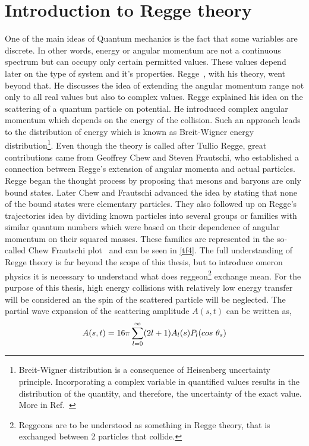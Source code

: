 \section{Introduction to Regge theory}
One of the main ideas of Quantum mechanics is the fact that some variables are discrete. In other words, energy or angular momentum are not a continuous spectrum but can occupy only certain permitted values. These values depend later on the type of system and it's properties. Regge~\cite{Regge}, with his theory, went beyond that. He discusses the idea of extending the angular momentum range not only to all real values but also to complex values. Regge explained his idea on the scattering of a quantum particle on potential. He introduced complex angular momentum which depends on the energy of the collision. Such an approach leads to the distribution of energy which is known as Breit-Wigner energy distribution\footnote{Breit-Wigner distribution is a consequence of Heisenberg uncertainty principle. Incorporating a complex variable in quantified values results in the distribution of the quantity, and therefore, the uncertainty of the exact value. More in Ref.~\cite{Breit1936}}. Even though the theory is called after Tullio Regge, great contributions came from Geoffrey Chew and Steven Frautschi, who established a connection between Regge's extension of angular momenta and actual particles. Regge began the thought process by proposing that mesons and baryons are only bound states. Later Chew and Frautschi advanced the idea by stating that none of the bound states were elementary particles. They also followed up on Regge's trajectories idea by dividing known particles into several groups or families with similar quantum numbers which were based on their dependence of angular momentum on their squared masses. These families are represented in the so-called Chew Frautschi plot~\cite{ChewFrautschi} and can be seen in \autoref{tf4}.  
\newline
The full understanding of Regge theory is far beyond the scope of this thesis, but to introduce \Pom omeron physics it is necessary to understand what does reggeon\footnote{Reggeons are to be understood as something in Regge theory, that is exchanged between 2 particles that collide.} exchange mean. For the purpose of this thesis, high energy collisions with relatively low energy transfer will be considered an the spin of the scattered particle will be neglected. The partial wave expansion of the scattering amplitude $A(s,t)$ can be written as,
\begin{equation}
    \centering
    A(s,t)=16\pi \sum_{l=0}^{\infty}(2l + 1)A_l(s)P_l(cos~\theta_s)
    \label{t27}
\end{equation}
